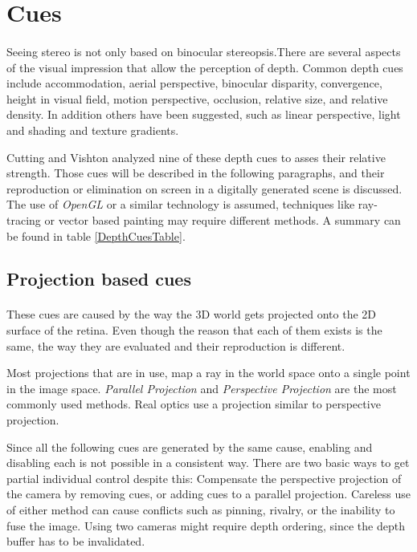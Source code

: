 \section{Cues\label{Cues}}
\paragraph{}
Seeing stereo is not only based on binocular stereopsis.There are several aspects of the visual impression that allow the perception of depth. Common depth cues include accommodation, aerial perspective, binocular disparity, convergence, height in visual field, motion perspective, occlusion, relative size, and relative density. In addition others have been suggested, such as linear perspective, light and shading and texture gradients.%

Cutting and Vishton\cite{DepthCues} analyzed nine of these depth cues to asses their relative strength. Those cues will be described in the following paragraphs, and their reproduction or elimination on screen in a digitally generated scene is discussed. The use of \textit{OpenGL} or a similar technology is assumed, techniques like ray-tracing or vector based painting may require different methods. A summary can be found in table \ref{DepthCuesTable}.


\subsection{Projection based cues}
\paragraph{}
These cues are caused by the way the 3D world gets projected onto the 2D surface of the retina.
Even though the reason that each of them exists is the same, the way they are evaluated and their reproduction is different.

Most projections\cite{proj} that are in use, map a ray in the world space onto a single point in the image space. \textit{Parallel Projection}\cite{parallel} and \textit{Perspective Projection}\cite{perspective} are the most commonly used methods. Real optics use a projection similar to perspective projection.

Since all the following cues are generated by the same cause, enabling and disabling each is not possible in a consistent way. There are two basic ways to get partial individual control despite this: Compensate  the perspective projection of the camera by removing cues, or  adding cues to a parallel projection. Careless use of either method can cause conflicts such as pinning, rivalry, or the inability to fuse the image.
Using two cameras might require depth ordering, since the depth buffer has to be invalidated.


